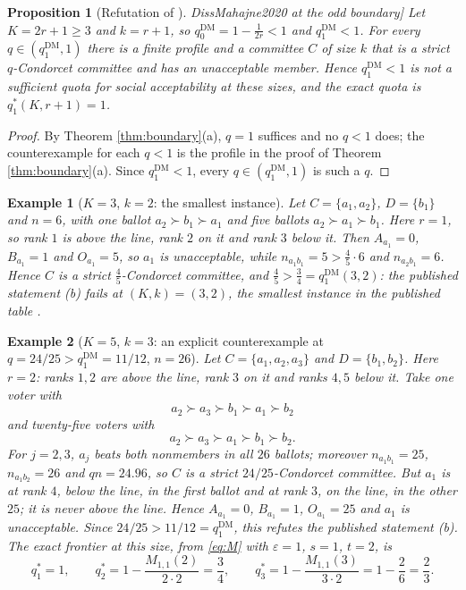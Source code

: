 \documentclass[11pt]{article}
\theoremstyle{plain}
\newtheorem{proposition}{Proposition}
\newtheorem{example}{Example}
\theoremstyle{definition}
\newcommand{\eps}{\varepsilon}
\newcommand{\DM}{\mathrm{DM}}
\begin{document}
\begin{proposition}[Refutation of \cite[Proposition~2(b)]{DissMahajne2020} at the odd boundary]
\label{prop:boundaryfalse}
Let $K=2r+1\ge3$ and $k=r+1$, so $q_0^{\DM}=1-\frac{1}{2r}<1$ and $q_1^{\DM}<1$. For every $q\in(q_1^{\DM},1)$ there is a finite profile and a committee $C$ of size $k$ that is a strict $q$-Condorcet committee and has an unacceptable member. Hence $q_1^{\DM}<1$ is not a sufficient quota for social acceptability at these sizes, and the exact quota is $q_1^*(K,r+1)=1$.
\end{proposition}

\begin{proof}
By Theorem \ref{thm:boundary}(a), $q=1$ suffices and no $q<1$ does; the counterexample for each $q<1$ is the profile in the proof of Theorem \ref{thm:boundary}(a). Since $q_1^{\DM}<1$, every $q\in(q_1^{\DM},1)$ is such a $q$.
\end{proof}

\begin{example}[$K=3$, $k=2$: the smallest instance]
\label{ex:K3}
Let $C=\{a_1,a_2\}$, $D=\{b_1\}$ and $n=6$, with one ballot $a_2\succ b_1\succ a_1$ and five ballots $a_2\succ a_1\succ b_1$. Here $r=1$, so rank $1$ is above the line, rank $2$ on it and rank $3$ below it. Then $A_{a_1}=0$, $B_{a_1}=1$ and $O_{a_1}=5$, so $a_1$ is unacceptable, while $n_{a_1b_1}=5>\frac45\cdot6$ and $n_{a_2b_1}=6$. Hence $C$ is a strict $\frac45$-Condorcet committee, and $\frac45>\frac34=q_1^{\DM}(3,2)$: the published statement (b) fails at $(K,k)=(3,2)$, the smallest instance in the published table \cite[Table~1]{DissMahajne2020}.
\end{example}

\begin{example}[$K=5$, $k=3$: an explicit counterexample at $q=24/25>q_1^{\DM}=11/12$, $n=26$]
\label{ex:counterexample}
Let $C=\{a_1,a_2,a_3\}$ and $D=\{b_1,b_2\}$. Here $r=2$: ranks $1,2$ are above the line, rank $3$ on it and ranks $4,5$ below it. Take one voter with
\[
a_2\succ a_3\succ b_1\succ a_1\succ b_2
\]
and twenty-five voters with
\[
a_2\succ a_3\succ a_1\succ b_1\succ b_2 .
\]
For $j=2,3$, $a_j$ beats both nonmembers in all $26$ ballots; moreover $n_{a_1b_1}=25$, $n_{a_1b_2}=26$ and $qn=24.96$, so $C$ is a strict $24/25$-Condorcet committee. But $a_1$ is at rank $4$, below the line, in the first ballot and at rank $3$, on the line, in the other $25$; it is never above the line. Hence $A_{a_1}=0$, $B_{a_1}=1$, $O_{a_1}=25$ and $a_1$ is unacceptable. Since $24/25>11/12=q_1^{\DM}$, this refutes the published statement (b). The exact frontier at this size, from \eqref{eq:M} with $\eps=1$, $s=1$, $t=2$, is
\[
q_1^*=1,\qquad q_2^*=1-\frac{M_{1,1}(2)}{2\cdot2}=\frac34,\qquad
q_3^*=1-\frac{M_{1,1}(3)}{3\cdot2}=1-\frac{2}{6}=\frac23 .
\]
\end{example}
\end{document}
